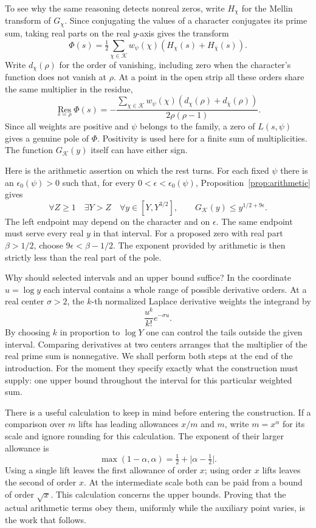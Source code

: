 To see why the same reasoning detects nonreal zeros, write \(H_\chi\)
for the Mellin transform of \(G_\chi\).
Since conjugating the values of a character conjugates its prime
sum, taking real parts on the real \(y\)-axis gives the transform
\[
       \Phi(s)=\tfrac12\sum_{\chi\in\mathcal K}w_\psi(\chi)
                         (H_\chi(s)+H_{\bar\chi}(s)).
\]
Write \(d_\chi(\rho)\) for the order of vanishing, including zero when
the character's function does not vanish at \(\rho\). At a point in
the open strip all these orders share the same multiplier in the residue,
\[
 \operatorname*{Res}_{s=\rho}\Phi(s)=
 -\frac{\sum_{\chi\in\mathcal K}w_\psi(\chi)
            (d_\chi(\rho)+d_{\bar\chi}(\rho))}
            {2\rho(\rho-1)} .
\]
Since all weights are positive and \(\psi\) belongs to the family,
a zero of \(L(s,\psi)\) gives a genuine pole of \(\Phi\). Positivity
is used here for a finite sum of multiplicities. The function
\(G_{\mathcal K}(y)\) itself can have either sign.

Here is the arithmetic assertion on which the rest turns. For each
fixed \(\psi\) there is an \(\epsilon_0(\psi)>0\) such that, for every
\(0<\epsilon<\epsilon_0(\psi)\), Proposition~\ref{prop:arithmetic} gives
\[
 \forall Z\ge1\quad\exists Y>Z\quad\forall y\in[Y,Y^{3/2}],
 \qquad G_{\mathcal K}(y)\le y^{1/2+9\epsilon}.
\]
The left endpoint may depend on the character and on \(\epsilon\).
The same endpoint must serve every real \(y\) in that interval.
For a proposed zero with real part \(\beta>1/2\), choose
\(9\epsilon<\beta-1/2\). The exponent provided by arithmetic is
then strictly less than the real part of the pole.

Why should selected intervals and an upper bound suffice? In the
coordinate \(u=\log y\) each interval contains a whole range
of possible derivative orders. At a real center \(\sigma>2\),
the \(k\)-th normalized Laplace derivative weights the integrand by
\[
                 \frac{u^k}{k!}e^{-\sigma u}.
\]
By choosing \(k\) in proportion to \(\log Y\) one can control the
tails outside the given interval. Comparing derivatives at two
centers arranges that the multiplier of the real prime sum is
nonnegative. We shall perform both steps at the end of the introduction.
For the moment they specify exactly what the construction must supply:
one upper bound throughout the interval for this particular weighted sum.

There is a useful calculation to keep in mind before entering the
construction. If a comparison over \(m\) lifts has leading allowances
\(x/m\) and \(m\), write \(m=x^\alpha\) for its scale and ignore
rounding for this calculation. The exponent of their larger allowance is
\[
       \max(1-\alpha,\alpha)
          =\tfrac12+\big|\alpha-\tfrac12\big| .
\]
Using a single lift leaves the first allowance of order \(x\); using
order \(x\) lifts leaves the second of order \(x\). At the intermediate
scale both can be paid from a bound of order \(\sqrt{x}\). This
calculation concerns the upper bounds. Proving that the actual
arithmetic terms obey them, uniformly while the auxiliary point varies,
is the work that follows.

